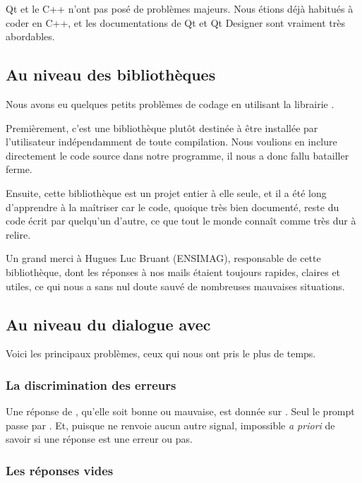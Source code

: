 		Qt et le C++ n'ont pas posé de problèmes majeurs. Nous étions déjà habitués à coder en C++, et les documentations de Qt et Qt Designer sont vraiment très abordables.
        
    \subsection{Au niveau des bibliothèques}
    
        Nous avons eu quelques petits problèmes de codage en utilisant la librairie \qcodeedit{}.

        Premièrement, c'est une bibliothèque plutôt destinée à être installée par l'utilisateur indépendamment de toute compilation.
        Nous voulions en inclure directement le code source dans notre programme, il nous a donc fallu batailler ferme.
        
        Ensuite, cette bibliothèque est un projet entier à elle seule, et il a été long d'apprendre à la maîtriser car le code, quoique très bien documenté, reste du code écrit par quelqu'un d'autre, ce que tout le monde connaît comme très dur à relire.

        Un grand merci à Hugues Luc Bruant (ENSIMAG), responsable de cette bibliothèque, dont les réponses à nos mails étaient toujours rapides, claires et utiles, ce qui nous a sans nul doute sauvé de nombreuses mauvaises situations.
		
    \subsection{Au niveau du dialogue avec \coq{}}
    
        Voici les principaux problèmes, ceux qui nous ont pris le plus de temps.

        \subsubsection{La discrimination des erreurs}

        	Une réponse de \coqtop{}, qu'elle soit bonne ou mauvaise, est donnée sur \stdout{}. Seul le prompt passe par \stderr{}.
        	Et, puisque \coqtop{} ne renvoie aucun autre signal, impossible \textit{a priori} de savoir si une réponse est une erreur ou pas.

        \subsubsection{Les réponses vides}

